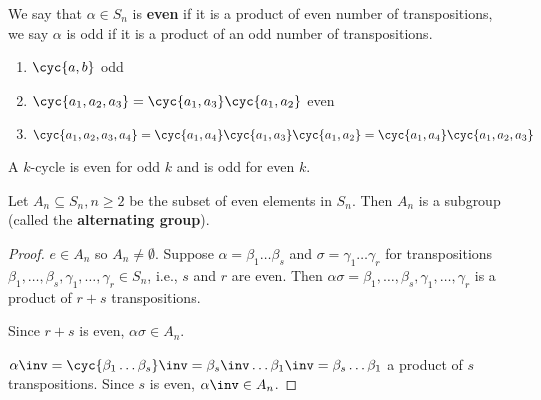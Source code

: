 \begin{definition}[parity]
    We say that $\alpha \in S_n$ is \textbf{even} if it is a product of even number of transpositions, we say $\alpha$ is odd if it is a product of an odd number of transpositions.
\end{definition}

\begin{example}
    \spacebeforelist
    \begin{enumerate}
        \item $\cyc{a,b}$ odd
        \item $\cyc{a_1,a_2,a_3} = \cyc{a_1,a_3}\cyc{a_1,a_2}$ even
        \item $\cyc{a_1,a_2,a_3,a_4} = \cyc{a_1,a_4}\cyc{a_1,a_3}\cyc{a_1,a_2} = \cyc{a_1,a_4}\cyc{a_1,a_2,a_3}$
    \end{enumerate}
\end{example}

\begin{remark}
    A $k$-cycle is even for odd $k$ and is odd for even $k$.
\end{remark}

\begin{theorem}
    Let $A_n \subseteq S_n, n \geq 2$ be the subset of even elements in $S_n$. Then $A_n$ is a subgroup (called the \textbf{alternating group}).
\end{theorem}
\begin{proof}
    $e \in A_n$ so $A_n \neq \emptyset$. Suppose $\alpha = \beta_1 \dots \beta_s$ and $\sigma = \gamma_1 \dots \gamma_r$ for transpositions $\beta_1,\dots,\beta_s,\gamma_1,\dots,\gamma_r \in S_n$, i.e., $s$ and $r$ are even. Then $\alpha\sigma = \beta_1,\dots,\beta_s,\gamma_1,\dots,\gamma_r$ is a product of $r + s$ transpositions.

    Since $r + s$ is even, $\alpha \sigma \in A_n$.

    $\alpha\inv = \cyc{\beta_1 \dots \beta_s}\inv = \beta_s\inv \dots \beta_1\inv = \beta_s \dots \beta_1$ a product of $s$ transpositions. Since $s$ is even, $\alpha\inv \in A_n$.
\end{proof}